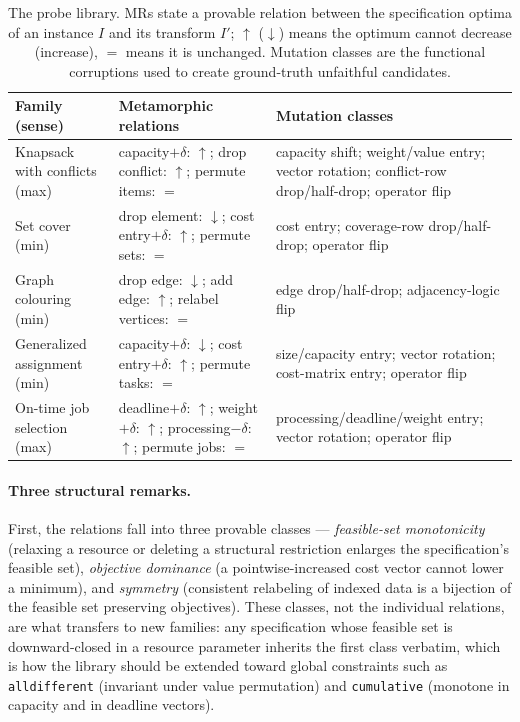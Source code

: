 \documentclass[pdflatex,sn-mathphys-num]{sn-jnl}
\theoremstyle{thmstyleone}
\theoremstyle{thmstyletwo}
\begin{document}
\begin{table}[t]
\caption{The probe library. MRs state a provable relation between the
specification optima of an instance $I$ and its transform $I'$;
$\uparrow$ ($\downarrow$) means the optimum cannot decrease
(increase), $=$ means it is unchanged. Mutation classes are the
functional corruptions used to create ground-truth unfaithful
candidates.}\label{tab:families}
\begin{tabular}{p{2.9cm}p{4.2cm}p{4.2cm}}
\toprule
Family (sense) & Metamorphic relations & Mutation classes\\
\midrule
Knapsack with conflicts (max) &
capacity$+\delta$: $\uparrow$; drop conflict: $\uparrow$; permute
items: $=$ &
capacity shift; weight/value entry; vector rotation; conflict-row
drop/half-drop; operator flip\\
\addlinespace
Set cover (min) &
drop element: $\downarrow$; cost entry$+\delta$: $\uparrow$; permute
sets: $=$ &
cost entry; coverage-row drop/half-drop; operator flip\\
\addlinespace
Graph colouring (min) &
drop edge: $\downarrow$; add edge: $\uparrow$; relabel vertices: $=$ &
edge drop/half-drop; adjacency-logic flip\\
\addlinespace
Generalized assignment (min) &
capacity$+\delta$: $\downarrow$; cost entry$+\delta$: $\uparrow$;
permute tasks: $=$ &
size/capacity entry; vector rotation; cost-matrix entry; operator
flip\\
\addlinespace
On-time job selection (max) &
deadline$+\delta$: $\uparrow$; weight$+\delta$: $\uparrow$;
processing$-\delta$: $\uparrow$; permute jobs: $=$ &
processing/deadline/weight entry; vector rotation; operator flip\\
\bottomrule
\end{tabular}
\end{table}

\paragraph{Three structural remarks.}
First, the relations fall into three provable classes ---
\emph{feasible-set monotonicity} (relaxing a resource or deleting a
structural restriction enlarges the specification's feasible set),
\emph{objective dominance} (a pointwise-increased cost vector cannot
lower a minimum), and \emph{symmetry} (consistent relabeling of
indexed data is a bijection of the feasible set preserving
objectives). These classes, not the individual relations, are what
transfers to new families: any specification whose feasible set is
downward-closed in a resource parameter inherits the first class
verbatim, which is how the library should be extended toward global
constraints such as \texttt{alldifferent} (invariant under value
permutation) and \texttt{cumulative} (monotone in capacity and in
deadline vectors).
\end{document}
